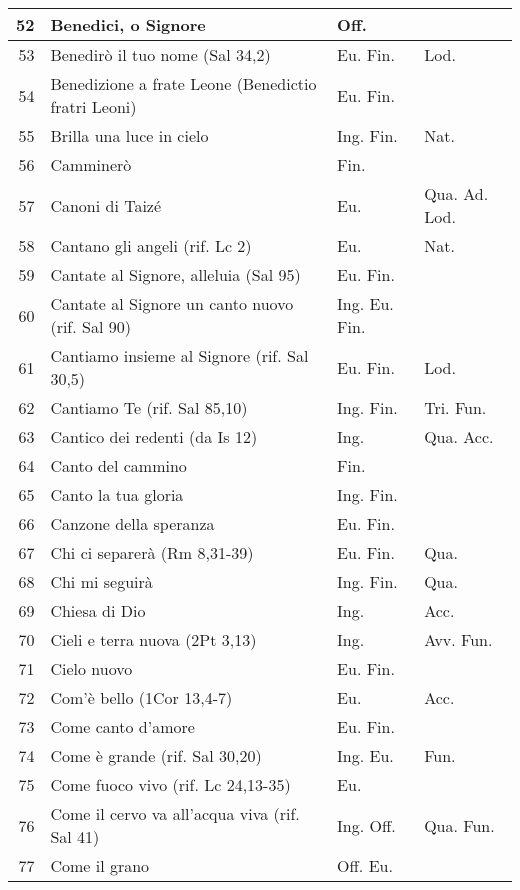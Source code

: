 {\begin{center}
\begin{longtable}{ | r | m{4.7cm} | m{1.8cm} | m{2cm}  |}
    52 & Benedici, o Signore & Off. & \\ \hline
    53 & Benedirò il tuo nome (Sal 34,2) & Eu. Fin. & Lod.\\ \hline
    54 & Benedizione a frate Leone (Benedictio fratri Leoni) & Eu. Fin. & \\ \hline
    55 & Brilla una luce in cielo & Ing. Fin. & Nat.\\ \hline
    56 & Camminerò & Fin. & \\ \hline
    57 & Canoni di Taizé & Eu. & Qua. Ad. Lod.\\ \hline
    58 & Cantano gli angeli (rif. Lc 2) & Eu. & Nat.\\ \hline
    59 & Cantate al Signore, alleluia (Sal 95) & Eu. Fin. & \\ \hline
    60 & Cantate al Signore un canto nuovo (rif. Sal 90) & Ing. Eu. Fin. & \\ \hline
    61 & Cantiamo insieme al Signore (rif. Sal 30,5) & Eu. Fin. & Lod.\\ \hline
    62 & Cantiamo Te (rif. Sal 85,10) & Ing. Fin. & Tri. Fun.\\ \hline
    63 & Cantico dei redenti (da Is 12) & Ing. & Qua. Acc.\\ \hline
    64 & Canto del cammino & Fin. & \\ \hline
    65 & Canto la tua gloria & Ing. Fin. & \\ \hline
    66 & Canzone della speranza & Eu. Fin. & \\ \hline
    67 & Chi ci separerà (Rm 8,31-39) & Eu. Fin. & Qua.\\ \hline
    68 & Chi mi seguirà & Ing. Fin. & Qua.\\ \hline
    69 & Chiesa di Dio & Ing. & Acc.\\ \hline
    70 & Cieli e terra nuova (2Pt 3,13) & Ing. & Avv. Fun.\\ \hline
    71 & Cielo nuovo & Eu. Fin. & \\ \hline
    72 & Com'è bello (1Cor 13,4-7) & Eu. & Acc.\\ \hline
    73 & Come canto d'amore & Eu. Fin. & \\ \hline
    74 & Come è grande (rif. Sal 30,20) & Ing. Eu. & Fun.\\ \hline
    75 & Come fuoco vivo (rif. Lc 24,13-35) & Eu. & \\ \hline
    76 & Come il cervo va all'acqua viva (rif. Sal 41) & Ing. Off. & Qua. Fun.\\ \hline
    77 & Come il grano & Off. Eu. & \\ \hline

\end{longtable}
\end{center}}
